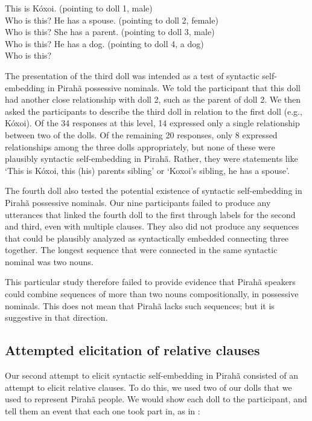 \documentclass[output=paper]{langscibook}
\begin{document}
\eal
\label{kohoi_ex}
\ex \label{kohoi_ex1} This is Kóxoi. (pointing to doll 1, male)\\
Who is this?
\ex \label{kohoi_ex2} He has a spouse. (pointing to doll 2, female)\\
Who is this?
\ex \label{kohoi_ex3} She has a parent. (pointing to doll 3, male)\\
Who is this?
\ex \label{kohoi_ex4} He has a dog. (pointing to doll 4, a dog)\\
Who is this?
\zl

The presentation of the third doll was intended as a test of syntactic self-embedding in Pirahã possessive nominals.  We told the participant that this doll had another close relationship with doll 2, such as the parent of doll 2.  We then asked the participants to describe the third doll in relation to the first doll (e.g., Kóxoi).  Of the 34 responses at this level, 14 expressed only a single relationship between two of the dolls.  Of the remaining 20 responses, only 8 expressed relationships among the three dolls appropriately, but none of these were plausibly syntactic self-embedding in Pirahã.  Rather, they were statements like ‘This is Kóxoi, this (his) parents sibling’ or ‘Koxoi’s sibling, he has a spouse’.

The fourth doll also tested the potential existence of syntactic self-embedding in Pirahã possessive nominals. Our nine participants failed to produce any utterances that linked the fourth doll to the first through labels for the second and third, even with multiple clauses.  They also did not produce any sequences that could be plausibly analyzed as syntactically embedded connecting three together. The longest sequence that were connected in the same syntactic nominal was two nouns.

This particular study therefore failed to provide evidence that Pirahã speakers could combine sequences of more than two nouns compositionally, in possessive nominals.  This does not mean that Pirahã lacks such sequences; but it is suggestive in that direction.

\subsection{Attempted elicitation of relative clauses}

Our second attempt to elicit syntactic self-embedding in Pirahã consisted of an attempt to elicit relative clauses.  To do this, we used two of our dolls that we used to represent Pirahã people. We would show each doll to the participant, and tell them an event that each one took part in, as in :
\end{document}
